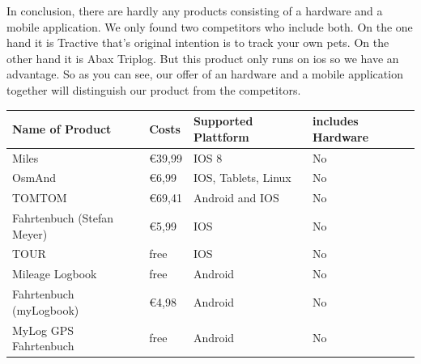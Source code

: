 In conclusion, there are hardly any products consisting of a hardware and a mobile application. We only found two competitors who include both. On the one hand it is Tractive that's original intention is to track your own pets. On the other hand it is Abax Triplog. But this product only runs on \gls{ios} so we have an advantage. So as you can see, our offer of an hardware and a mobile application together will distinguish our product from the competitors.
\newline\newline
\begin{singlespace}
\begin{tabular}{p{3cm}p{5cm}p{3cm}p{2cm}}
\toprule

  \textbf{Name of \newline Product} & \textbf{Costs} & \textbf{Supported Plattform} & \textbf{includes Hardware} \\
\midrule
  Miles                      & \euro 39,99                                                                                                 & IOS 8                 & No  \\ 
OsmAnd                     & \euro 6,99                                                                                                  & IOS, Tablets, Linux   & No  \\ 
TOMTOM                     & \euro 69,41                                                                                                 & Android and IOS       & No  \\ 
Fahrtenbuch (Stefan Meyer) & \euro 5,99                                                                                                  & IOS                   & No  \\ 
TOUR                       & free                                                                                                        & IOS                   & No  \\ 
Mileage Logbook            & free                                                                                                        & Android               & No  \\ 
Fahrtenbuch (myLogbook)    & \euro 4,98                                                                                                  & Android               & No  \\ 
MyLog GPS Fahrtenbuch      & free                                                                                                        & Android               & No  \\ 

\end{tabular}
\end{singlespace}
